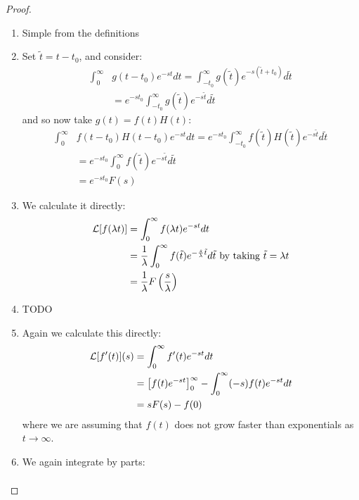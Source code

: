 \documentclass[../Main.tex]{subfiles}
\begin{document}
\begin{proof}
    \begin{enumerate}
        \item Simple from the definitions
        \item Set $\tilde{t} = t - t_0$, and consider:
            \begin{align*}
                \int_{0}^{\infty}& g(t - t_0) e^{-st} dt = \int_{-t_0}^{\infty} g(\tilde{t}) e^{-s(\tilde{t} + t_0)} d\tilde{t} \\
                &= e^{-st_0} \int_{-t_0}^{\infty} g(\tilde{t}) e^{-s\tilde{t}} d\tilde{t}
            \end{align*}
            and so now take $g(t) = f(t) H(t)$:
            \begin{align*}
                \int_{0}^{\infty}& f(t-t_0) H(t - t_0) e^{-st} dt = e^{-st_0} \int_{-t_0}^{\infty} f(\tilde{t}) H(\tilde{t}) e^{-s\tilde{t}} d\tilde{t} \\
                &= e^{-st_0} \int_{0}^{\infty} f(\tilde{t}) e^{-s\tilde{t}} d\tilde{t} \\
                &= e^{-st_0} F(s)
            \end{align*}
        \item We calculate it directly:
            \begin{align*}
                \mathcal{L}[f(\lambda t)] &= \int_{0}^{\infty} f(\lambda t) e^{-st} dt \\
                &= \frac1\lambda \int_{0}^{\infty} f(\tilde{t}) e^{-\frac{s}{\lambda}\tilde{t}} d\tilde{t} \text{ by taking } \tilde{t} = \lambda t \\
                &= \frac1\lambda F\left(\frac{s}{\lambda}\right)
            \end{align*}
        \item TODO %
        \item Again we calculate this directly:
            \begin{align*}
                \mathcal{L}[f'(t)](s) &= \int_{0}^{\infty} f'(t)e^{-st} dt \\
                &= \left[f(t) e^{-st}\right]_0^\infty - \int_{0}^{\infty} (-s) f(t) e^{-st} dt \\
                &= sF(s) - f(0)
            \end{align*}
            where we are assuming that $f(t)$ does not grow faster than exponentials as $t \to \infty$.
        \item We again integrate by parts:
            \begin{align*}

\end{align*}
\end{enumerate}
\end{proof}
\end{document}
